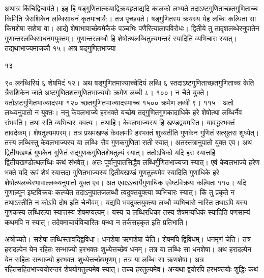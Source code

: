 \documentclass[11pt, openany]{book}
\begin{document}
\begin{sloppypar}
\hangindent=0.2in अथात्र किंचिद्विचार्यते। इह हि षड्गुणितात्कयाद्विक्रयहृताद्यदि कालको लभ्यते तदाऽष्टगुणिताच्छतगुणिताच्च किमिति त्रैराशिकेन लब्धिसाधनं कृतमाचार्यै:। तत्र पृच्छ्यते। षड्गुणितस्य क्रयस्य येह लब्धिः कल्पिता सा किमशेषा सशेषा वा। आद्ये शेषाभावाच्छेषमेकैकं पञ्चभिः पणैरित्यालापविरोधः। द्वितीये तु तादृशलब्धेरनुपातेन गुणान्तरलब्धिसाधनमयुक्तम्। गुणान्तरलब्धौ हि शेषोत्थलब्धितुल्यमन्तरं स्यादिति व्यभिचारः स्यात्। तद्यथा\textendash भाज्यमाजकौ १५। अत्र षड्गुणितभाज्या 

\hspace{3.85in}१३

\hangindent=0.2in ९० ल्लब्धिरियं ६ शेषमिदं १२। अथ षड्गुणितमाज्याच्चेदियं लब्धि ६ स्तदाऽष्टगुणिताच्छतगुणिताच्च केति त्रैराशिकेन जाते अष्टगुणितशतगुणितभाज्ययोः क्रमेण लब्धी ८। १००। न चैते युक्ते। यतोऽष्टगुणितभाज्यादस्मा १२० च्छतगुणितभाज्यादस्माच्च १५०० क्रमेण लब्धी ९। ११५। अतो लब्ध्यनुपातो न युक्तः। ननु केवलभाज्ये हरभक्ते यच्छेष तद्गुणितगुणकादाधिके हरे शेषोत्था लब्धिर्नैव संभवति। तथा सति व्यभिचारः क्वत्यः। तथाहि। केवलभाज्यस्य हि खण्डद्वयमस्ति। यावद्धरभक्तं तावदेकम्। शेषतुल्यमपरम्। तत्र प्रथमखण्डं केवलमपि हरभक्तं शुध्यतीति गुणकेन गुणितं सत्सुतरा शुध्येत्। तस्य लब्धिस्तु केवलभाज्यस्य या लब्धिः सैव गुणकगुणिता सती स्यात्। अतस्तत्रानुपातो युक्त एव। अथ द्वितीयखण्डं गुणकेन गुणितं सद्गुणकगुणितशेषतुल्यं स्यात्। ततोऽधिको यदि हरः स्यात्तर्हि द्वितीयखण्डोत्थलब्धिः कथं संभवेत्। अतः पूर्वानुपातसिद्धैव लब्धिर्गुणितभाज्यजा स्यात्। एवं केवलभाज्ये हरेण भक्ते यदि रूपं शेषं स्यात्तदा गुणितभाज्यस्य द्वितीयखण्डं गुणतुल्यमेव स्यादिति गुणाधिके हरे शेषोत्थलब्धेरभावाल्लब्ध्यनुपातो युक्त एव। अत एवाऽऽचार्यैगुणाधिक एवेष्टविक्रयः कल्पितः ११०। यदि गुणान्न्यून इष्टविक्रयः कल्प्येत तदाऽनुपातजलब्धौ त्वदुक्तयुक्त्या व्यभिचारः स्यात्। किं तु प्रकृते न तथाऽस्तीति न कोऽपि दोष इति चेन्मैवम्। यद्यपि भवदुक्तयुक्त्या लब्धौ व्यभिचारो नास्ति तथाऽपि यस्य गुणकस्य लब्धिरल्पा स्यात्तस्य शेषमप्यल्पम्। यस्य च लब्धिरधिका तस्य शेषमप्यधिकं स्यादिति पणसाम्यं कथमपि न स्यात्। तदेवमाचार्यविचारितः पन्था न तर्कसहकृत इति प्रतिभाति।

\vspace{5mm}

\hangindent=0.2in \hspace{0.2in}अत्रोच्यते। सशेषा लब्धिस्तावद्द्विविधा। धनशेषा ऋणशेषा चेति। शेषमपि द्विविधम्। धनमृणं चेति। तत्र हरादल्पेन येन रहितः सन्भाज्यो हरभक्तः शुध्येत्तच्छेषं धनम्। तत्र या लब्धिः सा धनशेषा। अथ हरादल्पेन येन सहितः सन्भाज्यो हरभक्तः शुध्येत्तच्छेषमृणम्। तत्र या लब्धिः सा ऋणशेषा। अत्र रहितसहितभाज्ययोरन्तरं शेषयोगतुल्यमेव स्यात्। तच्च हरतुल्यमेव। अन्यथा द्वयोरपि हरभक्तयोः शुद्धिः कथं
\end{sloppypar}
\thispagestyle{empty}
\newpage
\end{document}
